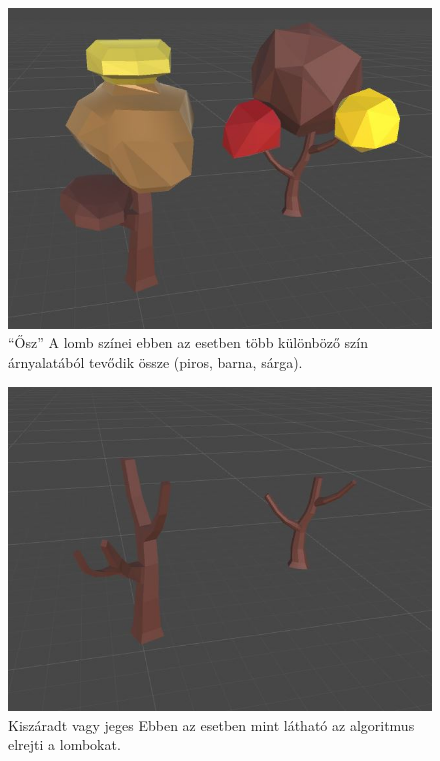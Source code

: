 \begin{figure}[h!]
\centering
\includegraphics[scale=0.32]{kepek/Tree_Fall.JPG}
\caption[Ősz]{“Ősz” A lomb színei ebben az esetben több különböző szín árnyalatából tevődik össze (piros, barna, sárga). \footnotemark}
\label{fig:Tree_Fall}
\end{figure}


\begin{figure}[h!]
\centering
\includegraphics[scale=0.32]{kepek/Tree_Winter.JPG}
\caption[tél]{Kiszáradt vagy jeges Ebben az esetben mint látható az algoritmus elrejti a lombokat. \footnotemark}
\label{fig:Tree_Winter}
\end{figure}

